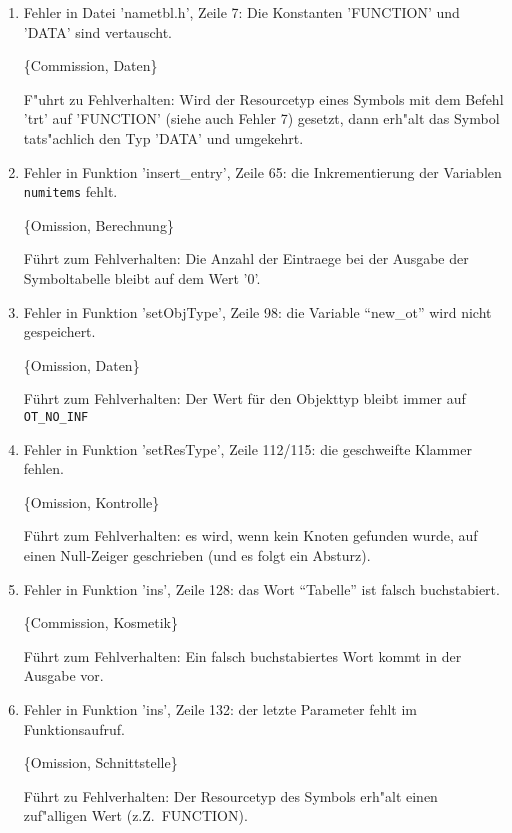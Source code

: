 
\begin{enumerate}
 
\item Fehler in Datei 'nametbl.h', Zeile 7: Die Konstanten 'FUNCTION' und
'DATA' sind vertauscht.
 
 \{Commission, Daten\}
 
F"uhrt zu Fehlverhalten: Wird der Resourcetyp eines Symbols mit dem 
Befehl 'trt' auf 'FUNCTION' (siehe auch Fehler 7) gesetzt, dann erh"alt das 
Symbol tats"achlich den Typ 'DATA' und umgekehrt.


\item Fehler in Funktion 'insert\_entry', Zeile 65: die Inkrementierung 
der Variablen {\tt numitems} fehlt.

\{Omission, Berechnung\}

F\"uhrt zum Fehlverhalten: Die Anzahl der Eintraege bei der
Ausgabe der Symboltabelle bleibt auf dem Wert '0'.



\item Fehler in Funktion 'setObjType', Zeile 98: die Variable "`new\_ot"' 
wird nicht gespeichert.

\{Omission, Daten\}

F\"uhrt zum Fehlverhalten: Der Wert f\"ur den Objekttyp bleibt immer auf
{\tt OT\_NO\_INF}


\item Fehler in Funktion 'setResType', Zeile 112/115: die geschweifte Klammer 
fehlen.

\{Omission, Kontrolle\}

F\"uhrt zum Fehlverhalten: es wird, wenn kein Knoten gefunden wurde, auf einen
Null-Zeiger geschrieben (und es folgt ein Absturz).



\item Fehler in Funktion 'ins', Zeile 128: das Wort "`Tabelle"' ist falsch 
buchstabiert.

\{Commission, Kosmetik\}

F\"uhrt zum Fehlverhalten: Ein falsch buchstabiertes Wort kommt in der
Ausgabe vor.


\item Fehler in Funktion 'ins', Zeile 132: der letzte Parameter fehlt im 
Funktionsaufruf.

\{Omission, Schnittstelle\}

F\"uhrt zu Fehlverhalten: Der Resourcetyp des Symbols erh"alt einen zuf"alligen
Wert (z.Z.~FUNCTION).



\end{enumerate}
